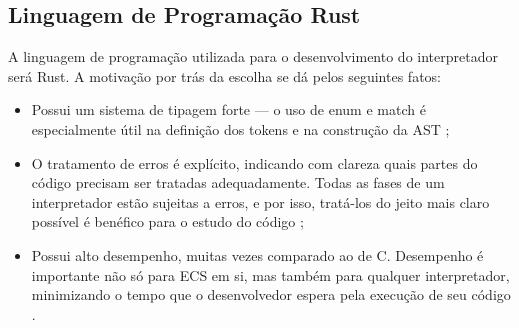\subsection{Linguagem de Programação Rust}

A linguagem de programação utilizada para o desenvolvimento do interpretador será Rust. A motivação por trás da escolha se dá pelos seguintes fatos:

\begin{itemize}
    \item Possui um sistema de tipagem forte — o uso de enum e match é especialmente útil na definição dos tokens e na construção da AST \cite{rustbook};
    \item O tratamento de erros é explícito, indicando com clareza quais partes do código precisam ser tratadas adequadamente. Todas as fases de um interpretador estão sujeitas a erros, e por isso, tratá-los do jeito mais claro possível é benéfico para o estudo do código \cite{rustbook};
    \item Possui alto desempenho, muitas vezes comparado ao de C. Desempenho é importante não só para ECS em si, mas também para qualquer interpretador, minimizando o tempo que o desenvolvedor espera pela execução de seu código \cite{rustbook}.
\end{itemize}
